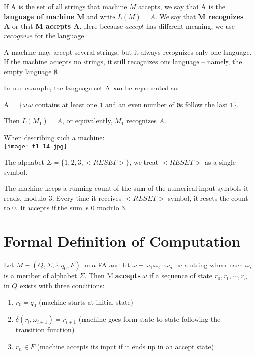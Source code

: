 If A is the set of all strings that machine \(M\) accepts, we say that A is the \textbf{language of machine M} and write \(L(M) = A\).   
We say that \textbf{M recognizes A} or that \textbf{M accepts A}.     
Here because \(accept\) has different meaning, we use \(recognize\) for the language.  

\begin{remark}
    A machine may accept several strings, but it always recognizes only one language.
    If the machine accepts no strings, it still recognizes one language -- namely, the empty language \(\emptyset\). 
\end{remark}

\begin{eg}
    In our example, the language set A can be represented as:

    A = \{\(\omega\)|\(\omega\) contains at least one \verb|1| and an even number of \verb|0|s follow the last \verb|1|\}.

    Then \(L(M_1) = A\), or equivalently, \(M_1\) recognizes \(A\).   
\end{eg}

\begin{eg}
    When describing such a machine:\\
    \texttt{[image: f1.14.jpg]}

    The alphabet \(\Sigma = \{ 1, 2, 3, <RESET> \} \), we treat \(<RESET>\) as a single symbol.  

    The machine keeps a running count of the sum of the numerical input symbols it reads, modulo 3.
    Every time it receives \(<RESET>\) symbol, it resets the count to 0. 
    It accepts if the sum is 0 modulo 3.
\end{eg}

\section{Formal Definition of Computation}

Let \(M = (Q, \Sigma, \delta, q_0, F)\) be a FA and let \(\omega = \omega_1\omega_2\cdots\omega_n\)  be a string where each \(\omega_i\) is a member of alphabet \(\Sigma\).   
Then M \textbf{accepts} \(\omega\) if a sequence of state \(r_0, r_1, \cdots, r_n\) in \(Q\)  exists with three conditions:
\begin{enumerate}
    \item \(r_0 = q_0\) (machine starts at initial state) 
    \item \(\delta(r_i, \omega_{i+1}) = r_{i+1}\)  (machine goes form state to state following the transition function)
    \item \(r_n \in F\) (machine accepts its input if it ends up in an accept state)
\end{enumerate}   

